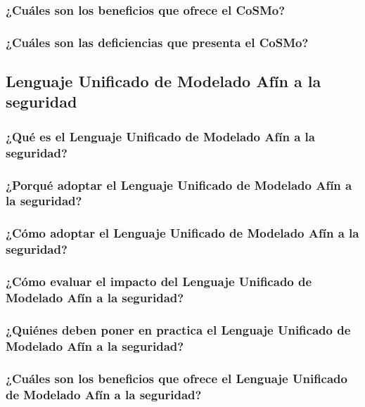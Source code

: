 \documentclass[runningheads,a4paper]{llncs}
\begin{document}
\subsubsection{¿Cuáles son los beneficios que ofrece el \gls{CoSMo}?}

\subsubsection{¿Cuáles son las deficiencias que presenta el \gls{CoSMo}?}



\subsection{Lenguaje Unificado de Modelado Afín a la seguridad}

\subsubsection{¿Qué es el Lenguaje Unificado de Modelado Afín a la seguridad?}

\subsubsection{¿Porqué adoptar el Lenguaje Unificado de Modelado Afín a la seguridad?}

\subsubsection{¿Cómo adoptar el Lenguaje Unificado de Modelado Afín a la seguridad?}

\subsubsection{¿Cómo evaluar el impacto del Lenguaje Unificado de Modelado Afín a la seguridad?}

\subsubsection{¿Quiénes deben poner en practica el Lenguaje Unificado de Modelado Afín a la seguridad?}

\subsubsection{¿Cuáles son los beneficios que ofrece el Lenguaje Unificado de Modelado Afín a la seguridad?}
\end{document}
